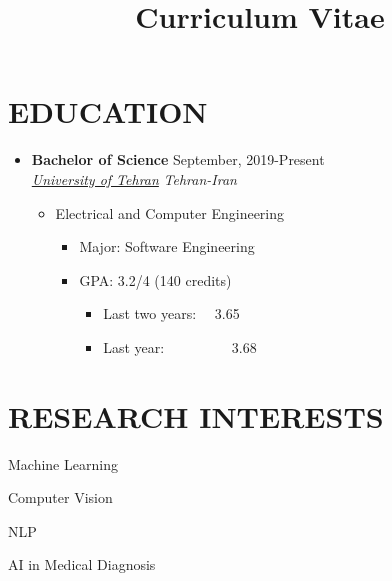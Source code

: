 \documentclass[11pt,letter,sans]{moderncv} %
\title{Curriculum Vitae}
\newcommand*{\authorimg}[1]{%
	\raisebox{-.25\baselineskip}{%
		\texttt{[image: \#1]}%
	}%
}
\begin{document}
\makecvtitle
\vspace*{-5mm}  %

\section{EDUCATION}
    \begin{itemize}
        \item \textbf{Bachelor of Science} \hfill September, 2019-Present \\
    	\href{https://ut.ac.ir/fa/}{\authorimg{Images/TehranUni.jpg} \emph{University of Tehran}} \hfill \emph{Tehran-Iran}
    		
    	\begin{itemize}
    		\item Electrical and Computer Engineering
    		\begin{itemize}		
    			\item Major: Software Engineering \hspace{10 pt} 
    			\item GPA: 3.2/4  (140 credits)
            \begin{itemize}
                \item Last two years: ~~3.65
                \item Last year:~~~~~~~~~ 3.68
            \end{itemize}
    		\end{itemize}
    	\end{itemize}
    \end{itemize}


\section{RESEARCH INTERESTS}
        \begin{itemize}
            \begin{multicols}{2}
                \item Machine Learning 
		    \item Computer Vision
		    \item NLP
                \item AI in Medical Diagnosis

            \end{multicols}
	\end{itemize}
\end{document}
